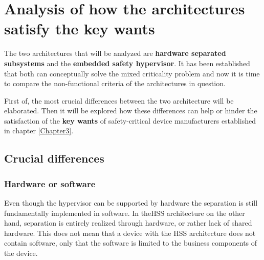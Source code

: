 
\chapter{Analysis of how the architectures satisfy the key wants} %

\label{Chapter4} %


\newcommand{\keyword}[1]{\textbf{#1}}
\newcommand{\tabhead}[1]{\textbf{#1}}
\newcommand{\code}[1]{\texttt{#1}}
\newcommand{\file}[1]{\texttt{\bfseries#1}}
\newcommand{\option}[1]{\texttt{\itshape#1}}


The two  architectures that will be analyzed are \keyword{hardware separated subsystems} and the \keyword{embedded safety hypervisor}. It has been established that both can conceptually solve the mixed criticality problem and now it is time to compare the non-functional criteria of the architectures in question. 

First of, the most crucial differences between the two architecture will be elaborated. Then it will be explored how these differences can help or hinder the satisfaction of the \keyword{key wants} of safety-critical device manufacturers established in chapter \ref{Chapter3}. 

\section{Crucial differences}
\subsection{Hardware or software}
Even though the hypervisor can be supported by hardware the separation is still fundamentally implemented in software. In the\gls{HSS} architecture on the other hand, separation is entirely realized through hardware, or rather lack of shared hardware. This does not mean that a device with the \gls{HSS} architecture does not contain software, only that the software is limited to the business components of the device.

